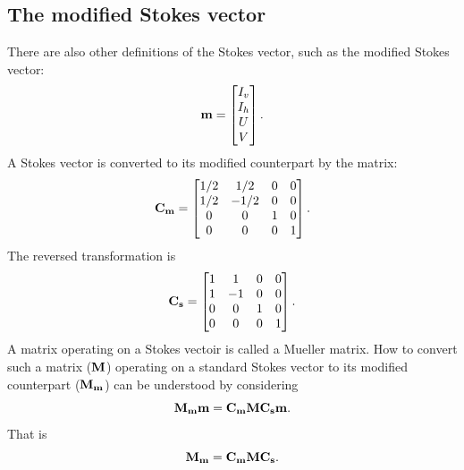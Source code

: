 \subsection{The modified Stokes vector}
%
There are also other definitions of the Stokes vector, such as the modified
Stokes vector:
\begin{equation}
  \mathbf{m} = \begin{bmatrix} I_v\\I_h\\U\\V \end{bmatrix}.
\end{equation}
A Stokes vector is converted to its modified counterpart by the matrix:
\begin{equation}
  \mathbf{C_m} = \begin{bmatrix}
    1/2&1/2&0&0\\
    1/2&-1/2&0&0\\
    0&0&1&0\\
    0&0&0&1\\
  \end{bmatrix}.
\end{equation}
The reversed transformation is
\begin{equation}
  \mathbf{C_s} = \begin{bmatrix}
    1&1&0&0\\
    1&-1&0&0\\
    0&0&1&0\\
    0&0&0&1\\
  \end{bmatrix}.
\end{equation}
A matrix operating on a Stokes vectoir is called a Mueller matrix. How to
convert such a matrix ($\mathbf{M}$) operating on a standard Stokes vector to its
modified counterpart ($\mathbf{M_m}$) can be understood by considering
\begin{equation}
  \mathbf{M_mm} = \mathbf{C_mMC_sm}.
\end{equation}
That is 
\begin{equation}
  \mathbf{M_m} = \mathbf{C_mMC_s}.
  \label{eq:mueller_convert}
\end{equation}


